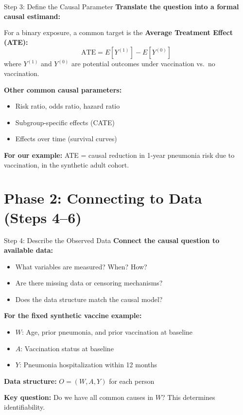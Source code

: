 \documentclass[aspectratio=169]{beamer}
\begin{document}
\begin{frame}{Step 3: Define the Causal Parameter}
  \small
  \textbf{Translate the question into a formal causal estimand:}
  \vspace{0.5em}

  For a binary exposure, a common target is the \textbf{Average Treatment Effect (ATE):}
  \[
    \text{ATE} = E[Y^{(1)}] - E[Y^{(0)}]
  \]
  where $Y^{(1)}$ and $Y^{(0)}$ are potential outcomes under vaccination vs.\ no vaccination.
  \vspace{0.5em}

  \textbf{Other common causal parameters:}
  \begin{itemize}
    \item Risk ratio, odds ratio, hazard ratio
    \item Subgroup-specific effects (CATE)
    \item Effects over time (survival curves)
  \end{itemize}
  \vspace{0.5em}

  \textcolor{accent}{\textbf{For our example:}} ATE = causal reduction in 1-year pneumonia risk due to vaccination, in the synthetic adult cohort.
\end{frame}

\section{Phase 2: Connecting to Data (Steps 4--6)}

\begin{frame}{Step 4: Describe the Observed Data}
  \small
  \textbf{Connect the causal question to available data:}
  \begin{itemize}
    \item What variables are measured? When? How?
    \item Are there missing data or censoring mechanisms?
    \item Does the data structure match the causal model?
  \end{itemize}
  \vspace{0.25em}

  \textbf{For the fixed synthetic vaccine example:}
  \begin{itemize}
    \item $W$: Age, prior pneumonia, and prior vaccination at baseline
    \item $A$: Vaccination status at baseline
    \item $Y$: Pneumonia hospitalization within 12 months
  \end{itemize}
  \vspace{0.2em}

  \textbf{Data structure:} \quad $O = (W, A, Y)$ for each person
  \vspace{0.2em}

  \textcolor{accent}{\textbf{Key question:}} Do we have all common causes in $W$? This determines identifiability.
\end{frame}
\end{document}

